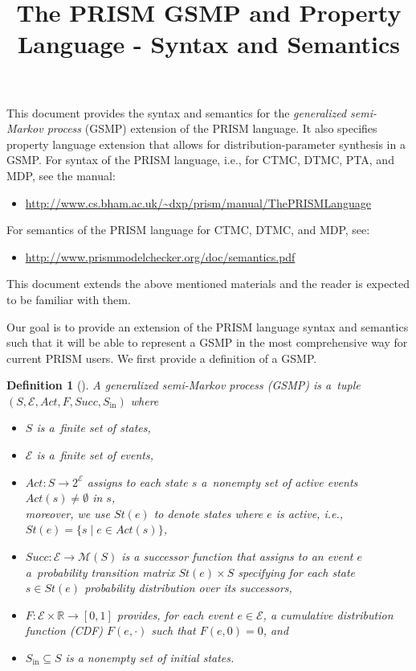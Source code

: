 \documentclass{article}
\title{The PRISM GSMP and Property Language - Syntax and Semantics}
\newtheorem*{definition*}{Definition}
\newcommand{\Rset}{\mathbb{R}}
\newcommand{\calM}{\mathcal{M}}
\newcommand{\calG}{\mathcal{G}}
\newcommand{\calE}{\mathcal{E}}
\renewcommand{\_}{\underline{~}}
\newcommand{\events}{{\calE}}
\newcommand{\suc}{Succ}
\newcommand{\initstate}{s_\mathrm{in}}
\newcommand{\initstates}{S_\mathrm{in}}
\newcommand{\act}{Act}
\newcommand{\transmats}{\calM}
\begin{document}
\maketitle

\noindent
This document provides the syntax and semantics for the \emph{generalized semi-Markov process} (GSMP) extension of the PRISM language. It also specifies property language extension that allows for distribution-parameter synthesis in a GSMP.
For syntax of the PRISM language, i.e., for CTMC, DTMC, PTA, and MDP, see the manual:
\begin{itemize}
	\item \url{http://www.cs.bham.ac.uk/~dxp/prism/manual/ThePRISMLanguage}
\end{itemize}
For semantics of the PRISM language for CTMC, DTMC, and MDP, see:
\begin{itemize}
	\item \url{http://www.prismmodelchecker.org/doc/semantics.pdf}
\end{itemize}
This document extends the above mentioned materials and the reader is expected to be familiar with them.

Our goal is to provide an extension of the PRISM language syntax and semantics such that it will be able to represent a GSMP in the most comprehensive way for current PRISM users. 
We first provide a definition of a GSMP.

\begin{definition*}[\cite{Haas:book}] 
	A generalized semi-Markov process (GSMP) is a~tuple $%
	(S,\events,\act,F,\suc,\initstates)$ where
	\begin{itemize}
		\item $S$ is a~finite set of states,
		\item $\events$ is a~finite set of \emph{events},
		\item $\act \colon S \to 2^{\events}$ assigns to each state $s$ a~nonempty set of active events $\act(s) \not = \emptyset$ in $s$,\\ moreover, we use $St(e)$ to denote states where $e$ is active, i.e., $St(e)=\{s \mid e \in \act(s)\}$,
		\item $\suc : \events \to \transmats(S)$ is a \emph{successor function} that assigns to an event $e$ a~probability transition matrix $St(e)\times S$ 
		specifying for each state $s\in St(e)$ probability distribution over its successors,	
		\item $F\colon \events \times \Rset \to [0,1]$ provides, for each event $e \in \events$, a cumulative distribution function (CDF) $F(e,\cdot)$ such that $F(e,0)=0$, and 
		\item $\initstates \subseteq S$ is a nonempty set of \emph{initial states}.
	\end{itemize}
\end{definition*}
\end{document}
